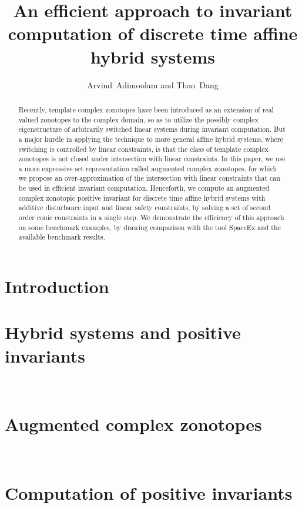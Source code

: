 \documentclass{llncs}
\title{An efficient approach to invariant computation of discrete time affine hybrid systems
}
\author{Arvind\ Adimoolam and Thao\ Dang
}
\institute{\ Verimag,~Grenoble, France\\ \url{{santosh.adimoolam,thao.dang}@univ-grenoble-alpes.fr}.
}
\begin{document}
\maketitle

\begin{abstract}
Recently, template complex zonotopes have been introduced as an
extension of real valued zonotopes to the complex domain, so as to
utilize the possibly complex eigenstructure of arbitrarily switched
linear systems during invariant computation.  But a major hurdle in
applying the technique to more general affine hybrid systems, where
switching is controlled by linear constraints, is that the class of
template complex zonotopes is not closed under intersection with
linear constraints.  In this paper, we use a more expressive set
representation called augmented complex zonotopes, for which we
propose an over-approximation of the intersection with linear
constraints that can be used in efficient invariant computation.
Henceforth, we compute an augmented complex zonotopic positive
invariant for discrete time affine hybrid systems with additive
disturbance input and linear safety constraints, by solving a set of
second order conic constraints in a single step.  We demonstrate the
efficiency of this approach on some benchmark examples,
by drawing comparison with the tool SpaceEx and the available
benchmark results.
\end{abstract}

\section{Introduction}


\section{Hybrid systems and positive invariants}~\label{sec:system}




\section{Augmented complex zonotopes}~\label{sec:acz}




\section{Computation of positive invariants}~\label{sec:invcomp}

\end{document}
